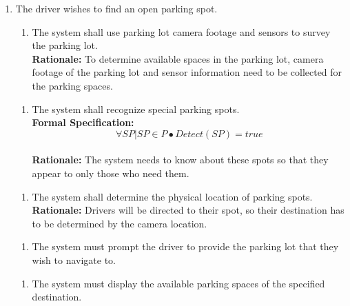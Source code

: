 \documentclass[12pt,letterpaper]{article}
\newcounter{businesseventnum}
\newcounter{funcreqnum}
\begin{document}
\begin{enumerate}[{BE}\thebusinesseventnum.] 
\item The driver wishes to find an open parking spot.
\begin{enumerate}[{FR}\thefuncreqnum.] 
    \item The system shall use parking lot camera footage and sensors to survey the parking lot. \label{poc1}\\
    \textbf{Rationale:} To determine available spaces in the parking lot, camera footage of the parking lot and sensor information need to be collected for the parking spaces.
\end{enumerate}
\begin{enumerate}[{FR}\thefuncreqnum.] 
    \item The system shall recognize special parking spots.\\
    \textbf{Formal Specification: } \[\forall SP | SP \in P  \bullet Detect(SP) = true\]\\
    \textbf{Rationale:} The system needs to know about these spots so that they appear to only those who need them.
\end{enumerate}
\begin{enumerate}[{FR}\thefuncreqnum.] 
    \item The system shall determine the physical location of parking spots. \label{poc2}\\
    \textbf{Rationale:} Drivers will be directed to their spot, so their destination has to be determined by the camera location.
\end{enumerate}
\begin{enumerate}[{FR}\thefuncreqnum.] 
    \item The system must prompt the driver to provide the parking lot that they wish to navigate to.
\end{enumerate}
\begin{enumerate}[{FR}\thefuncreqnum.] 
    \item The system must display the available parking spaces of the specified destination.
\end{enumerate}
\end{enumerate}
\end{document}
